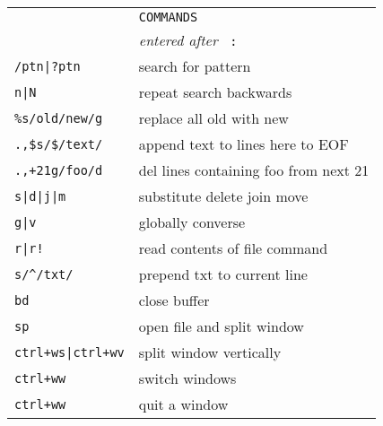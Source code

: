 \begin{tabular}{ll}
&\texttt{COMMANDS}\\
&\emph{entered after }\texttt{ :}\\
\texttt{/ptn|?ptn}& search \textbar{} for pattern\\
\texttt{n|N}& repeat search \textbar{} backwards\\
\texttt{\%s/old/new/g}&replace all old with new\\
\texttt{.,\$s/\$/text/}&append text to lines here to EOF\\
\texttt{.,+21g/foo/d}&del lines containing foo from next 21\\
\texttt{s|d|j|m}&substitute \textbar{} delete \textbar{} join \textbar{}move\\
\texttt{g|v}& globally \textbar{} converse\\
\texttt{r|r!}& read contents of file \textbar{} command\\
\texttt{s/\^{}/txt/}&prepend txt to current line\\
\texttt{bd}&close buffer\\
\texttt{sp}&open file and split window\\
\texttt{ctrl+ws|ctrl+wv}&split window\textbar{} vertically\\
\texttt{ctrl+ww}&switch windows\\
\texttt{ctrl+ww}&quit a window\\
\end{tabular}

\clearpage
